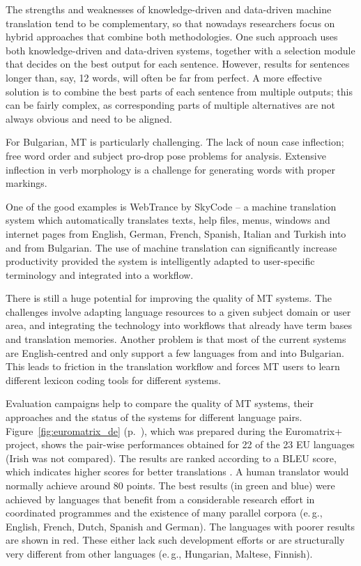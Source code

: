 \documentclass[]{../../metanetpaper}
\begin{document}
\begin{multicols}{2}

The strengths and weaknesses of knowledge-driven and data-driven machine translation tend to be complementary, so that nowadays researchers focus on hybrid approaches that combine both methodologies. One such approach uses both knowledge-driven and data-driven systems, together with a selection module that decides on the best output for each sentence. However, results for sentences longer than, say, 12 words, will often be far from perfect. A more effective solution is to combine the best parts of each sentence from multiple outputs; this can be fairly complex, as corresponding parts of multiple alternatives are not always obvious and need to be aligned. 

For Bulgarian, MT is particularly challenging. The lack of noun case inflection; free word order and subject pro-drop pose problems for analysis. Extensive inflection in verb morphology is a challenge for generating words with proper markings. 

One of the good examples is WebTrance by SkyCode – a machine translation system which automatically translates texts, help files, menus, windows and internet pages from English, German, French, Spanish, Italian and Turkish into and from Bulgarian.  The use of machine translation can significantly increase productivity provided the system is intelligently adapted to user-specific terminology and integrated into a workflow. 

There is still a huge potential for improving the quality of MT systems. The challenges involve adapting language resources to a given subject domain or user area, and integrating the technology into workflows that already have term bases and translation memories. Another problem is that most of the current systems are English-centred and only support a few languages from and into Bulgarian. This leads to friction in the translation workflow and forces MT users to learn different lexicon coding tools for different systems.

Evaluation campaigns help to compare the quality of MT systems, their approaches and the status of the systems for different language pairs. Figure~\ref{fig:euromatrix_de} (p.~\pageref{fig:euromatrix_de}), which was prepared during the Euromatrix+ project, shows the pair-wise performances obtained for 22 of the 23 EU languages (Irish was not compared). The results are ranked according to a BLEU score, which indicates higher scores for better translations \cite{bleu1}. A human translator would normally achieve around 80 points. The best results (in green and blue) were achieved by languages that benefit from a considerable research effort in coordinated programmes and the existence of many parallel corpora (e.\,g., English, French, Dutch, Spanish and German). The languages with poorer results are shown in red. These either lack such development efforts or are structurally very different from other languages (e.\,g., Hungarian, Maltese, Finnish).


\end{multicols}
\end{document}
